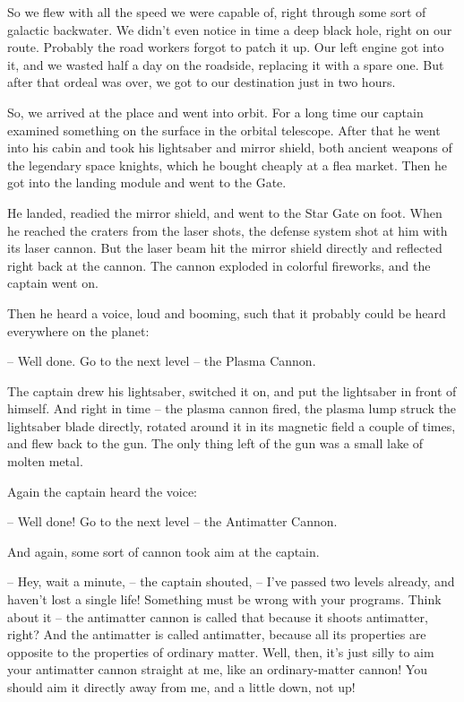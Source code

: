 \documentclass[ebook,oneside,final,openright]{memoir}
\begin{document}
So we flew with all the speed we were capable of, right through some sort of galactic backwater. We didn’t even notice in time a deep black hole, right on our route. Probably the road workers forgot to patch it up. Our left engine got into it, and we wasted half a day on the roadside, replacing it with a spare one. But after that ordeal was over, we got to our destination just in two hours.\par
\par
So, we arrived at the place and went into orbit. For a long time our captain examined something on the surface in the orbital telescope. After that he went into his cabin and took his lightsaber and mirror shield, both ancient weapons of the legendary space knights, which he bought cheaply at a flea market. Then he got into the landing module and went to the Gate.\par
\par
He landed, readied the mirror shield, and went to the Star Gate on foot. When he reached the craters from the laser shots, the defense system shot at him with its laser cannon. But the laser beam hit the mirror shield directly and reflected right back at the cannon. The cannon exploded in colorful fireworks, and the captain went on.\par
\par
Then he heard a voice, loud and booming, such that it probably could be heard everywhere on the planet:\par
– Well done. Go to the next level – the Plasma Cannon.\par
The captain drew his lightsaber, switched it on, and put the lightsaber in front of himself. And right in time – the plasma cannon fired, the plasma lump struck the lightsaber blade directly, rotated around it in its magnetic field a couple of times, and flew back to the gun. The only thing left of the gun was a small lake of molten metal.\par
\par
Again the captain heard the voice:\par
– Well done! Go to the next level – the Antimatter Cannon.\par
And again, some sort of cannon took aim at the captain.\par
– Hey, wait a minute, – the captain shouted, – I’ve passed two levels already, and haven’t lost a single life! Something must be wrong with your programs. Think about it – the antimatter cannon is called that because it shoots antimatter, right? And the antimatter is called antimatter, because all its properties are opposite to the properties of ordinary matter. Well, then, it’s just silly to aim your antimatter cannon straight at me, like an ordinary-matter cannon! You should aim it directly away from me, and a little down, not up!\par
\end{document}
